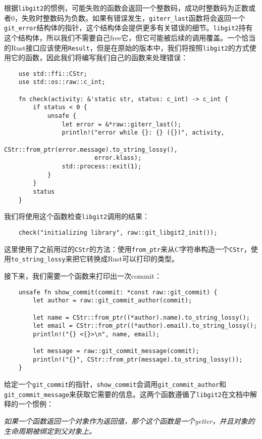 根据\texttt{libgit2}的惯例，可能失败的函数会返回一个整数码，成功时整数码为正数或者0，失败时整数码为负数。如果有错误发生，\texttt{giterr\_last}函数将会返回一个\texttt{git\_error}结构体的指针，这个结构体会提供更多有关错误的细节。\texttt{libgit2}持有这个结构体，所以我们不需要自己free它，但它可能被后续的调用覆盖。一个恰当的Rust接口应该使用\texttt{Result}，但是在原始的版本中，我们将按照\texttt{libgit2}的方式使用它的函数，因此我们将编写我们自己的函数来处理错误：
\begin{verbatim}
    use std::ffi::CStr;
    use std::os::raw::c_int;

    fn check(activity: &'static str, status: c_int) -> c_int {
        if status < 0 {
            unsafe {
                let error = &*raw::giterr_last();
                println!("error while {}: {} ({})", activity,
                         CStr::from_ptr(error.message).to_string_lossy(),
                         error.klass);
                std::process::exit(1);
            }
        }
        status
    }
\end{verbatim}

我们将使用这个函数检查\texttt{libgit2}调用的结果：
\begin{verbatim}
    check("initializing library", raw::git_libgit2_init());
\end{verbatim}

这里使用了之前用过的\texttt{CStr}的方法：使用\texttt{from\_ptr}来从C字符串构造一个\texttt{CStr}，使用\texttt{to\_string\_lossy}来把它转换成Rust可以打印的类型。

接下来，我们需要一个函数来打印出一次commit：
\begin{verbatim}
    unsafe fn show_commit(commit: *const raw::git_commit) {
        let author = raw::git_commit_author(commit);

        let name = CStr::from_ptr((*author).name).to_string_lossy();
        let email = CStr::from_ptr((*author).email).to_string_lossy();
        println!("{} <{}>\n", name, email);

        let message = raw::git_commit_message(commit);
        println!("{}", CStr::from_ptr(message).to_string_lossy());
    }
\end{verbatim}

给定一个\texttt{git\_commit}的指针，\texttt{show\_commit}会调用\texttt{git\_commit\_author}和\\
\texttt{git\_commit\_message}来获取它需要的信息。这两个函数遵循了\texttt{libgit2}在文档中解释的一个惯例：

\emph{如果一个函数返回一个对象作为返回值，那个这个函数是一个getter，并且对象的生命周期被绑定到父对象上。}

